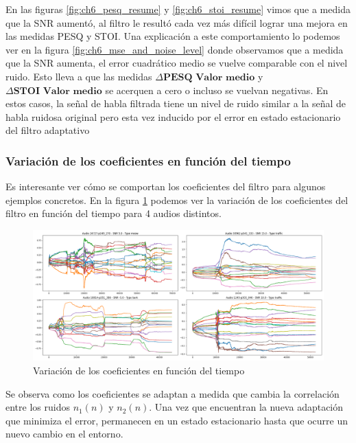 En las figuras \ref{fig:ch6_pesq_resume} y \ref{fig:ch6_stoi_resume} vimos que a medida que la SNR aumentó, al filtro le resultó cada vez más difícil lograr una mejora en las medidas PESQ y STOI. Una explicación a este comportamiento lo podemos ver en la figura \ref{fig:ch6_mse_and_noise_level} donde observamos que a medida que la SNR aumenta, el error cuadrático medio se vuelve comparable con el nivel ruido. Esto lleva a que las medidas $\Delta \textbf{PESQ Valor medio}$ y $\Delta \textbf{STOI Valor medio}$ se acerquen a cero o incluso se vuelvan negativas. En estos casos, la señal de habla filtrada tiene un nivel de ruido similar a la señal de habla ruidosa original pero esta vez inducido por el error en estado estacionario del filtro adaptativo \cite{fundamentals_of_adaptive_filtering}

\subsubsection{Variación de los coeficientes en función del tiempo}

Es interesante ver cómo se comportan los coeficientes del filtro para algunos ejemplos concretos. En la figura \ref{fig:ch6_variacion_temporal_de_coeficientes}  podemos ver la variación de los coeficientes del filtro en función del tiempo para 4 audios distintos. 

\begin{figure}
	\centering
	\centerline{\includegraphics[scale=0.35]{images/ch6/af/weights/weights.png}}
	\caption{Variación de los coeficientes en función del tiempo}
	\label{fig:ch6_variacion_temporal_de_coeficientes}
\end{figure}

Se observa como los coeficientes se adaptan a medida que cambia la correlación entre los ruidos $n_1(n)$ y $n_2(n)$. Una vez que encuentran la nueva adaptación que minimiza el error, permanecen en un estado estacionario hasta que ocurre un nuevo cambio en el entorno.

